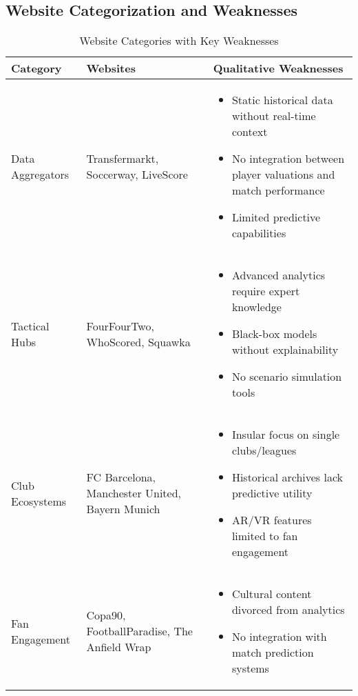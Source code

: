 \subsection{Website Categorization and Weaknesses}
\begin{table}[h!]
    \centering
    \caption{Website Categories with Key Weaknesses}
    \label{tab:category-weaknesses}
    \scriptsize
    \begin{tabularx}{\textwidth}{|l|X|X|}
        \hline
        \textbf{Category} & \textbf{Websites} & \textbf{Qualitative Weaknesses} \\
        \hline
        Data Aggregators & Transfermarkt, Soccerway, LiveScore & 
        \begin{itemize}
            \item Static historical data without real-time context
            \item No integration between player valuations and match performance
            \item Limited predictive capabilities
        \end{itemize} \\
        \hline
        Tactical Hubs & FourFourTwo, WhoScored, Squawka & 
        \begin{itemize}
            \item Advanced analytics require expert knowledge
            \item Black-box models without explainability
            \item No scenario simulation tools
        \end{itemize} \\
        \hline
        Club Ecosystems & FC Barcelona, Manchester United, Bayern Munich & 
        \begin{itemize}
            \item Insular focus on single clubs/leagues
            \item Historical archives lack predictive utility
            \item AR/VR features limited to fan engagement
        \end{itemize} \\
        \hline
        Fan Engagement & Copa90, FootballParadise, The Anfield Wrap & 
        \begin{itemize}
            \item Cultural content divorced from analytics
            \item No integration with match prediction systems

\end{itemize}
\end{tabularx}
\end{table}
